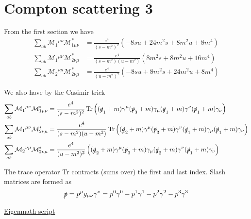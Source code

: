 

\section*{Compton scattering 3}

From the first section we have
\begin{align*}
\sum_{ab}\mathcal M_{1}{}^{\mu\nu}\mathcal M^*_{1\mu\nu}
&=\frac{e^4}{(s-m^2)^2}
\left(-8 s u + 24 m^2 s + 8 m^2 u + 8 m^4\right)
\\
\sum_{ab}\mathcal M_{1}{}^{\mu\nu}\mathcal M^*_{2\nu\mu}
&=\frac{e^4}{(s-m^2)(u-m^2)}
\left(8 m^2 s + 8 m^2 u + 16 m^4\right)
\\
\sum_{ab}\mathcal M_{2}{}^{\nu\mu}\mathcal M^*_{2\nu\mu}
&=\frac{e^4}{(u-m^2)^2}
\left(-8 s u + 8 m^2 s + 24 m^2 u + 8 m^4\right)
\end{align*}

We also have by the Casimir trick
\begin{align*}
\sum_{ab}\mathcal M_{1}{}^{\mu\nu}\mathcal M^*_{1\mu\nu}
&=\frac{e^4}{(s-m^2)^2}
\operatorname{Tr}
\left(
(\slashed q_1+m)\gamma^\mu(\slashed p_3+m)\gamma_\mu(\slashed q_1+m)\gamma^\nu(\slashed p_1+m)\gamma_\nu
\right)
\\
\sum_{ab}\mathcal M_{1}{}^{\mu\nu}\mathcal M^*_{2\nu\mu}
&=\frac{e^4}{(s-m^2)(u-m^2)}
\operatorname{Tr}
\left(
(\slashed q_2+m)\gamma^\mu(\slashed p_3+m)\gamma^\nu(\slashed q_1+m)\gamma_\mu(\slashed p_1+m)\gamma_\nu
\right)
\\
\sum_{ab}\mathcal M_{2}{}^{\nu\mu}\mathcal M^*_{2\nu\mu}
&=\frac{e^4}{(u-m^2)^2}
\left(
(\slashed q_2+m)\gamma^\mu(\slashed p_3+m)\gamma_\mu(\slashed q_2+m)\gamma^\nu(\slashed p_1+m)\gamma_\nu
\right)
\end{align*}

The trace operator Tr contracts (sums over) the first and last index.
Slash matrices are formed as
\begin{equation*}
\slashed p=p^\mu g_{\mu\nu}\gamma^\nu
=p^0\gamma^0-p^1\gamma^1-p^2\gamma^2-p^3\gamma^3
\end{equation*}

\href{https://georgeweigt.github.io/examples/compton-scattering-3-demo.html}{Eigenmath script}


